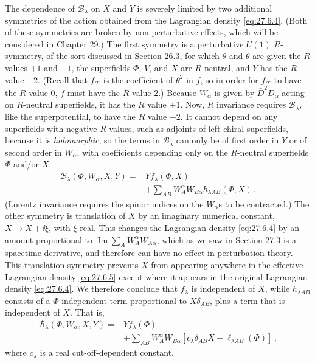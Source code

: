 The dependence of \(\mathcal{B}_\lambda\) on \(X\) and \(Y\) is severely
limited by two additional symmetries of the action obtained from the
Lagrangian density \eqref{eq:27.6.4}. (Both of these symmetries are broken by
non-perturbative effects, which will be considered in Chapter 29.) The first
symmetry is a perturbative \(U(1)\) \(R\)-symmetry, of the sort discussed in
Section 26.3, for which \(\theta\) and \(\bar\theta\) are given the \(R\)
values \(+1\) and \(-1\), the superfields \(\Phi\), \(V\), and \(X\) are
\(R\)-neutral, and \(Y\) has the \(R\) value \(+2\). (Recall that
\(f_{\mathcal{F}}\) is the coefficient of \(\theta^2\) in \(f\), so in
order for \(f_{\mathcal{F}}\) to have the \(R\) value 0, \(f\) must have
the \(R\) value 2.) Because \(W_\alpha\) is given by \(\bar D^2D_\alpha\)
acting on \(R\)-neutral superfields, it has the \(R\)
value \(+1\). Now, \(R\) invariance requires \(\mathcal{B}_\lambda\), like
the superpotential, to have the \(R\) value \(+2\). It cannot depend on any
superfields with negative \(R\) values, such as adjoints of left-chiral
superfields, because it is \emph{holomorphic}, so the terms in
\(\mathcal{B}_\lambda\) can only be of first order in \(Y\) or of second
order in \(W_\alpha\), with coefficients depending only on the \(R\)-neutral
superfields \(\Phi\) and/or \(X\):
\begin{equation}
  \begin{aligned}
  \mathcal{B}_\lambda(\Phi,W_\alpha,X,Y)
  ={}&
  Yf_\lambda(\Phi,X)
  \\
  &+\sum_{AB}W_A^\alpha W_{B\alpha}
  h_{\lambda AB}(\Phi,X)\,.
  \end{aligned}
  \tag{27.6.6}\label{eq:27.6.6}
\end{equation}
(Lorentz invariance requires the spinor indices on the \(W_\alpha\)s to be
contracted.) The other symmetry is
translation of \(X\) by an imaginary numerical constant,
\(X\longrightarrow X+\ii\xi\), with \(\xi\) real. This changes the Lagrangian
density \eqref{eq:27.6.4} by an amount proportional to
\(\operatorname{Im}\sum_AW_A^\alpha W_{A\alpha}\), which as
we saw in Section 27.3 is a spacetime derivative, and therefore can have no
effect in perturbation theory. This translation symmetry prevents \(X\)
from appearing anywhere in the effective Lagrangian density
\eqref{eq:27.6.5} except where it appears in the original Lagrangian density
\eqref{eq:27.6.4}. We therefore conclude that \(f_\lambda\) is independent
of \(X\), while \(h_{\lambda AB}\) consists of a \(\Phi\)-independent term
proportional to \(X\delta_{AB}\), plus a term that is independent of \(X\).
That is,
\begin{equation}
  \begin{aligned}
  \mathcal{B}_\lambda(\Phi,W_\alpha,X,Y)
  ={}&
  Yf_\lambda(\Phi)
  \\
  &+\sum_{AB}W_A^\alpha W_{B\alpha}
  \left[
    c_\lambda\delta_{AB}X+\ell_{\lambda AB}(\Phi)
  \right]\,,
  \end{aligned}
  \tag{27.6.7}\label{eq:27.6.7}
\end{equation}
where \(c_\lambda\) is a real cut-off-dependent constant.

